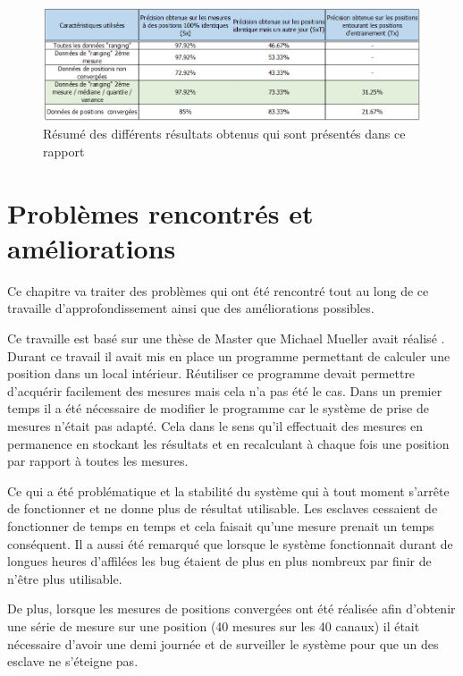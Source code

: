 \begin{figure}[htp]
	\begin{center}
		\includegraphics[scale=0.7]{figures/Resultats.png}
		\caption{Résumé des différents résultats obtenus qui sont présentés dans ce rapport}
		\label{fig:result} %
	\end{center}
\end{figure}

\chapter{Problèmes rencontrés et améliorations}
Ce chapitre va traiter des problèmes qui ont été rencontré tout au long de ce travaille d'approfondissement ainsi que des améliorations possibles.

Ce travaille est basé sur une thèse de Master que Michael Mueller avait réalisé \cite{MIC}. Durant ce travail il avait mis en place un programme permettant de calculer une position dans un local intérieur. Réutiliser ce programme devait permettre d'acquérir facilement des mesures mais cela n'a pas été le cas. Dans un premier temps il a été nécessaire de modifier le programme car le système de prise de mesures n'était pas adapté. Cela dans le sens qu'il effectuait des mesures en permanence en stockant les résultats et en recalculant à chaque fois une position par rapport à toutes les mesures. 

Ce qui a été problématique et la stabilité du système qui à tout moment s'arrête de fonctionner et ne donne plus de résultat utilisable. Les esclaves cessaient de fonctionner de temps en temps et cela faisait qu'une mesure prenait un temps conséquent. Il a aussi été remarqué que lorsque le système fonctionnait durant de longues heures d'affilées les bug étaient de plus en plus nombreux par finir de n'être plus utilisable. 

De plus, lorsque les mesures de positions convergées ont été réalisée afin d'obtenir une série de mesure sur une position (40 mesures sur les 40 canaux) il était nécessaire d'avoir une demi journée et de surveiller le système pour que un des esclave ne s'éteigne pas. 

